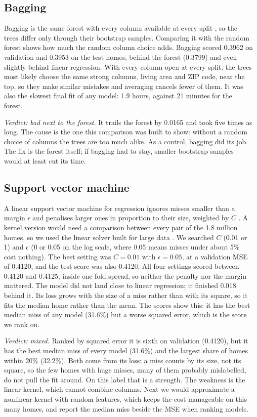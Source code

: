 \documentclass[sigconf,nonacm,10pt]{acmart}
\begin{document}
\subsection{Bagging}
Bagging is the same forest with every column available at every split \cite{breiman1996}, so the trees differ only through their bootstrap samples. Comparing it with the random forest shows how much the random column choice adds. Bagging scored 0.3962 on validation and 0.3953 on the test homes, behind the forest (0.3799) and even slightly behind linear regression. With every column open at every split, the trees most likely choose the same strong columns, living area and ZIP code, near the top, so they make similar mistakes and averaging cancels fewer of them. It was also the slowest final fit of any model: 1.9 hours, against 21 minutes for the forest.

\emph{Verdict: bad next to the forest.} It trails the forest by 0.0165 and took five times as long. The cause is the one this comparison was built to show: without a random choice of columns the trees are too much alike. As a control, bagging did its job. The fix is the forest itself; if bagging had to stay, smaller bootstrap samples would at least cut its time.

\subsection{Support vector machine}
A linear support vector machine for regression ignores misses smaller than a margin $\epsilon$ and penalises larger ones in proportion to their size, weighted by $C$ \cite{cortes1995}. A kernel version would need a comparison between every pair of the 1.8 million homes, so we used the linear solver built for large data \cite{ho2012}. We searched $C$ (0.01 or 1) and $\epsilon$ (0 or 0.05 on the log scale, where 0.05 means misses under about 5\% cost nothing). The best setting was $C = 0.01$ with $\epsilon = 0.05$, at a validation MSE of 0.4120, and the test score was also 0.4120. All four settings scored between 0.4120 and 0.4125, inside one fold spread, so neither the penalty nor the margin mattered. The model did not land close to linear regression; it finished 0.018 behind it. Its loss grows with the size of a miss rather than with its square, so it fits the median home rather than the mean. The scores show this: it has the best median miss of any model (31.6\%) but a worse squared error, which is the score we rank on.

\emph{Verdict: mixed.} Ranked by squared error it is sixth on validation (0.4120), but it has the best median miss of every model (31.6\%) and the largest share of homes within 20\% (32.2\%). Both come from its loss: a miss counts by its size, not its square, so the few homes with huge misses, many of them probably mislabelled, do not pull the fit around. On this label that is a strength. The weakness is the linear kernel, which cannot combine columns. Next we would approximate a nonlinear kernel with random features, which keeps the cost manageable on this many homes, and report the median miss beside the MSE when ranking models.
\end{document}
